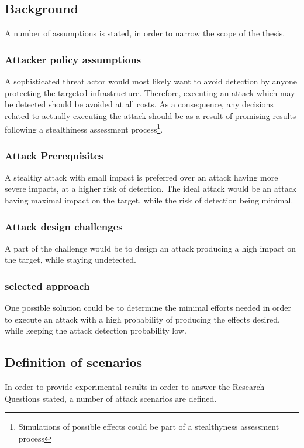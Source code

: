 \subsection{Background} 

A number of assumptions is stated, in order to narrow the scope of the thesis.

\subsubsection{Attacker policy assumptions}
A sophisticated threat actor would most likely want to avoid detection by anyone protecting the targeted infrastructure.
Therefore, executing an attack which may be detected should be avoided at all costs.
As a consequence, any decisions related to actually executing the attack should be as a result of promising results following a stealthiness assessment process\footnote{Simulations of possible effects could be part of a stealthyness assessment process}. 

\subsubsection{Attack Prerequisites}
A stealthy attack with small impact is preferred over an attack having more severe impacts, at a higher risk of detection.
The ideal attack would be an attack having maximal impact on the target, while the risk of detection being minimal. 


\subsubsection{Attack design challenges}
A part of the challenge would be to design an attack producing a high impact on the target, while staying undetected.

\subsubsection{selected approach}
One possible solution could be to determine the minimal efforts needed in order to execute an attack with a high probability of producing the effects desired, while keeping the attack detection probability low.



\subsection{Definition of scenarios}
In order to provide experimental results in order to answer the Research Questions stated, a number of attack scenarios are defined.

